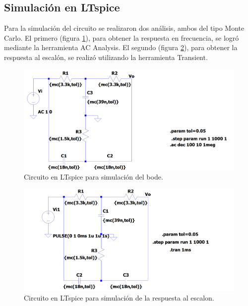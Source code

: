 \subsection{Simulaci\'on en LTspice}
Para la simulaci\'on del circuito se realizaron dos an\'alisis, ambos del tipo Monte Carlo.
El primero (figura \ref{fig: LTspice Bode}), para obtener la respuesta en frecuencia, se logr\'o mediante la herramienta AC Analysis.
El segundo (figura \ref{fig: LTspice Escalon}), para obtener la respuesta al escal\'on, se realiz\'o utilizando la herramienta Transient.

\begin{figure}[H]
    \begin{minipage}{\textwidth}
        \centering
        \includegraphics[width=\textwidth]{EJ1/Bode LTspice.png}
        \caption{Circuito en LTspice para simulaci\'on del bode.}
         \label{fig: LTspice Bode}
    \end{minipage}\hfill
\end{figure}
\begin{figure}[H]
    \begin{minipage}{\textwidth}
        \centering
        \includegraphics[width=\textwidth]{EJ1/Respuesta al escalon LTspice.png}
        \caption{Circuito en LTspice para simulaci\'on de la respuesta al escalon.}
         \label{fig: LTspice Escalon}
    \end{minipage}\hfill
\end{figure}



